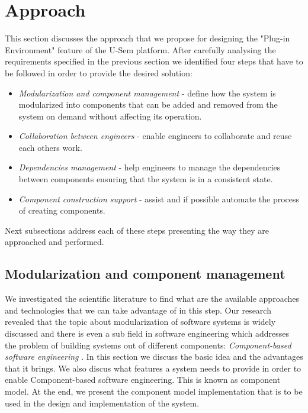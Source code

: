 \section{Approach}
\label{sec:approachPlugin}

This section discusses the approach that we propose for designing the "Plug-in Environment" feature of the U-Sem platform. After carefully analysing the requirements specified in the previous section we identified four steps that have to be followed in order to provide the desired solution:

\begin{itemize}
	\item \textit{Modularization and component management} - define how the system is modularized into components that can be added and removed from the system on demand without affecting its operation.
	\item \textit{Collaboration between engineers} - enable engineers to collaborate and reuse each others work.
	\item \textit{Dependencies management} - help engineers to manage the dependencies between components ensuring that the system is in a consistent state.
	\item \textit{Component construction support} - assist and if possible automate the process of creating components.
\end{itemize}

Next subsections address each of these steps presenting the way they are approached and performed. 

\subsection{Modularization and component management}
\label{sec:pluginModulAndManag}

We investigated the scientific literature to find what are the available approaches and technologies that we can take advantage of in this step. Our research revealed that the topic about modularization of software systems is widely discussed and there is even a sub field in software engineering which addresses the problem of building systems out of different components: \textit{Component-based software engineering}  \cite{jifeng2005component}. In this section we discuss the basic idea and the advantages that it brings. We also discus what features a system needs to provide in order to enable Component-based software engineering. This is known as component model. At the end, we present the component model implementation that is to be used in the design and implementation of the system. 

